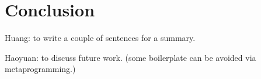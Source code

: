 \section{Conclusion}\label{sec:conclusion}

Huang: to write a couple of sentences for a summary.

\noindent Haoyuan: to discuss future work. (some boilerplate can be avoided via metaprogramming.)